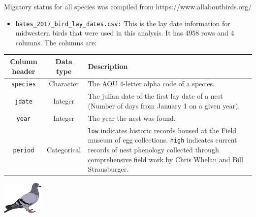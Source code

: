 \documentclass[10pt,a4paper]{article}
\begin{document}
 Migatory status for all species was compiled from https://www.allaboutbirds.org/
 
 \vspace{1.5mm}

\begin{itemize}
\item \texttt{bates\_2017\_bird\_lay\_dates.csv:} This is the lay date information for midwestern birds that were used in this analysis. It has 4958 rows and 4 columns. The columns are:
\end{itemize}

\begin{center}
    \begin{tabular}{ | c | c | p{12cm} |}
    \hline
    Column header & Data type & Description\\
    \hline
     \texttt{species}& Character & The AOU 4-letter alpha code of a species.\\
     \hline
     \texttt{jdate} & Integer & The julian date of the first lay date of a nest (Number of days from January 1 on a given year). \\
    \hline
    \texttt{year} & Integer &  The year the nest was found. \\
    \hline
    \texttt{period} & Categorical &  \texttt{low} indicates historic records housed at the Field museum of egg collections. \texttt{high} indicates current records of nest phenology collected through comprehensive field work by Chris Whelan and Bill Strausburger. \\
    \hline
    \end{tabular}
\end{center}


\begin{center}
\vspace{4mm}
\includegraphics[width=0.15\textwidth]{rock_dove.png}
\end{center}
\end{document}
